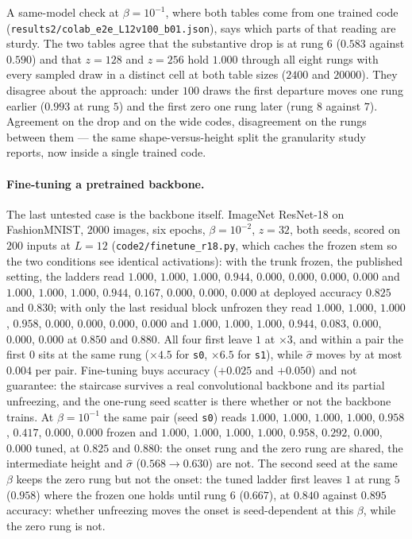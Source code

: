 \documentclass[11pt]{article}
\begin{document}
A same-model check at $\beta=10^{-1}$, where both tables come from one trained code
(\texttt{results2/colab\_e2e\_L12v100\_b01.json}), says which parts of that reading are sturdy. The
two tables agree that the substantive drop is at rung $6$ ($0.583$ against $0.590$) and that
$z=128$ and $z=256$ hold $1.000$ through all eight rungs with every sampled draw in a distinct cell
at both table sizes ($2400$ and $20000$). They disagree about the approach: under $100$ draws
the first departure moves one rung earlier ($0.993$ at rung $5$) and the first zero one rung later
(rung $8$ against $7$). Agreement on the drop and on the wide codes, disagreement on the rungs
between them --- the same shape-versus-height split the granularity study reports, now inside a
single trained code.

\paragraph{Fine-tuning a pretrained backbone.}
The last untested case is the backbone itself. ImageNet ResNet-18 on FashionMNIST, $2000$ images,
six epochs, $\beta=10^{-2}$, $z=32$, both seeds, scored on $200$ inputs at $L=12$
(\texttt{code2/finetune\_r18.py}, which caches the frozen stem so the two conditions see identical
activations): with the trunk frozen, the published setting, the ladders read $1.000$, $1.000$,
$1.000$, $0.944$, $0.000$, $0.000$, $0.000$, $0.000$ and $1.000$, $1.000$, $1.000$, $0.944$, $0.167$,
$0.000$, $0.000$, $0.000$ at deployed accuracy $0.825$ and $0.830$; with only the last residual
block unfrozen they read $1.000$, $1.000$, $1.000$, $0.958$, $0.000$, $0.000$, $0.000$, $0.000$ and
$1.000$, $1.000$, $1.000$, $0.944$, $0.083$, $0.000$, $0.000$, $0.000$ at $0.850$ and $0.880$. All
four first leave $1$ at $\times3$, and within a pair the first $0$ sits at the same rung
($\times4.5$ for \texttt{s0}, $\times6.5$ for \texttt{s1}), while $\hat\sigma$ moves by at most
$0.004$ per pair. Fine-tuning buys accuracy ($+0.025$ and
$+0.050$) and not guarantee: the staircase survives a real convolutional backbone and its partial
unfreezing, and the one-rung seed scatter is there whether or not the backbone trains. At
$\beta=10^{-1}$ the same pair (seed \texttt{s0}) reads $1.000$, $1.000$, $1.000$, $1.000$, $0.958$,
$0.417$, $0.000$, $0.000$ frozen and $1.000$, $1.000$, $1.000$, $1.000$, $0.958$, $0.292$, $0.000$,
$0.000$ tuned, at $0.825$ and $0.880$: the onset rung and the zero rung are shared, the
intermediate height and $\hat\sigma$ ($0.568\to0.630$) are not. The second seed at the same $\beta$
keeps the zero rung but not the onset: the tuned ladder first leaves $1$ at rung $5$ ($0.958$) where
the frozen one holds until rung $6$ ($0.667$), at $0.840$ against $0.895$ accuracy: whether
unfreezing moves the onset is seed-dependent at this $\beta$, while the zero rung is not.
\end{document}
